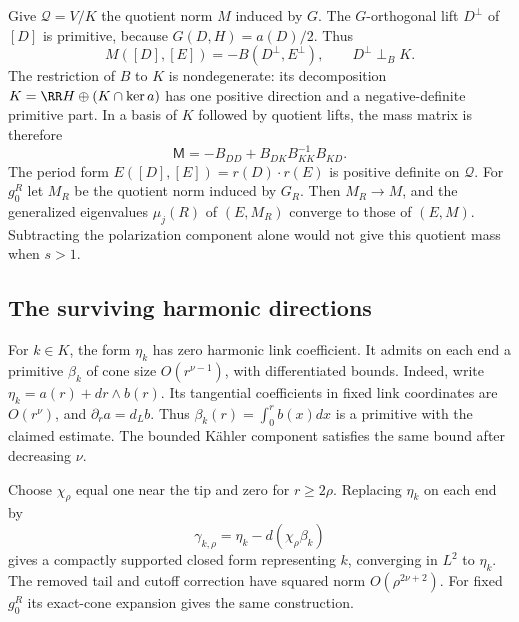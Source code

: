 Give $\mathcal Q=V/K$ the quotient norm $M$ induced by $G$.
The $G$-orthogonal lift $D^\perp$ of $[D]$ is primitive, because
$G(D,H)=a(D)/2$. Thus
\begin{equation}\label{eq:quotient-mass-matrix}
 M([D],[E])=-B(D^\perp,E^\perp),\qquad
 D^\perp\perp_B K.
\end{equation}
The restriction of $B$ to $K$ is nondegenerate: its decomposition
$K=\RR H\oplus(K\cap\ker a)$ has one positive direction and a
negative-definite primitive part. In a basis of $K$ followed by
quotient lifts, the mass matrix is therefore
\begin{equation}\label{eq:mass-schur}
 \mathsf M=-B_{DD}+B_{DK}B_{KK}^{-1}B_{KD}.
\end{equation}
The period form
$E([D],[E])=r(D)\cdot r(E)$ is positive definite on $\mathcal Q$.
For $g_0^R$ let $M_R$ be the quotient norm induced by $G_R$.
Then $M_R\to M$, and the generalized eigenvalues
$\mu_j(R)$ of $(E,M_R)$ converge to those of $(E,M)$.
Subtracting the polarization component alone would not give this
quotient mass when $s>1$.

\subsection{The surviving harmonic directions}
For $k\in K$, the form $\eta_k$ has zero harmonic link coefficient.
It admits on each end a primitive $\beta_k$ of cone size
$O(r^{\nu-1})$, with differentiated bounds. Indeed, write
$\eta_k=a(r)+dr\wedge b(r)$. Its tangential coefficients in fixed
link coordinates are $O(r^\nu)$, and
$\partial_ra=d_Lb$. Thus $\beta_k(r)=\int_0^r b(x)dx$ is a
primitive with the claimed estimate. The bounded K\"ahler component
satisfies the same bound after decreasing $\nu$.

Choose $\chi_\rho$ equal one near the tip and zero for $r\ge2\rho$.
Replacing $\eta_k$ on each end by
\begin{equation}\label{eq:closed-compact-approximation}
 \gamma_{k,\rho}=\eta_k-d(\chi_\rho\beta_k)
\end{equation}
gives a compactly supported closed form representing $k$, converging
in $L^2$ to $\eta_k$. The removed tail and cutoff correction have
squared norm $O(\rho^{2\nu+2})$.
For fixed $g_0^R$ its exact-cone expansion gives the same construction.

